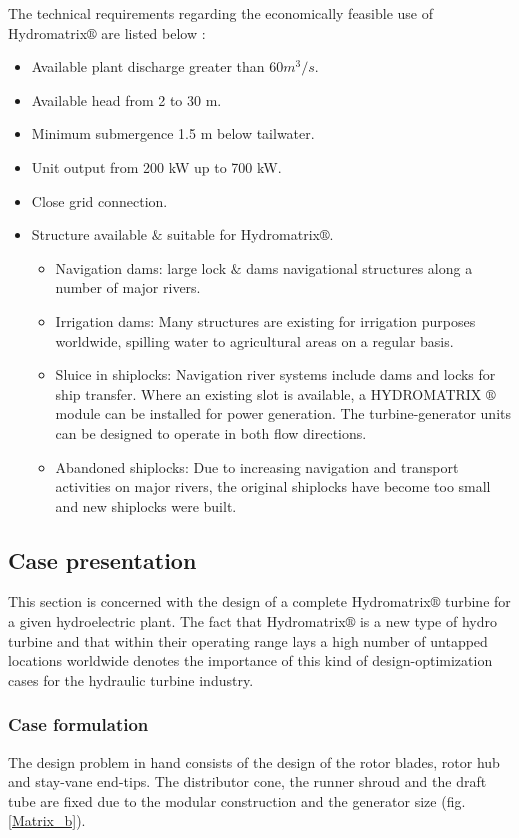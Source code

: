 The technical requirements regarding the economically feasible use of Hydromatrix$\circledR$ are listed below \cite{matrix,matrix_2}: 
\begin{itemize}
\item Available plant discharge greater than $60 m^3/s$. 
\item Available head from 2 to 30 m. 
\item Minimum submergence 1.5 m below tailwater.
\item Unit output from 200 kW up to 700 kW.
\item Close grid connection.
\item Structure available $\&$ suitable for Hydromatrix$\circledR$. 
\begin{itemize}
	\item Navigation dams: large lock $\&$ dams navigational structures along a number of major rivers. 
	\item Irrigation dams: Many structures are existing for irrigation purposes worldwide, spilling water to agricultural areas on a regular basis.
	\item Sluice in shiplocks: Navigation river systems include dams and locks for ship transfer. Where an existing slot is available, a HYDROMATRIX $\circledR$ module can be installed for power generation. The turbine-generator units can be designed to operate in both flow directions. 
	\item Abandoned shiplocks: Due to increasing navigation and transport activities on major rivers, the original shiplocks have become too small and new shiplocks were built.
\end{itemize}
\end{itemize}

\subsection{Case presentation}
This section is concerned with the design of a complete Hydromatrix$\circledR$ turbine for a given hydroelectric plant. The fact that Hydromatrix$\circledR$ is a new type of hydro turbine and that within their operating range lays a high number of untapped locations worldwide denotes the importance of this kind of design-optimization cases for the hydraulic turbine industry.    


\subsubsection{Case formulation}
The design problem in hand consists of the design of the rotor blades, rotor hub and stay-vane end-tips. The distributor cone, the runner shroud and the draft tube are fixed due to the modular construction and the generator size (fig.\ref{Matrix_b}).     


